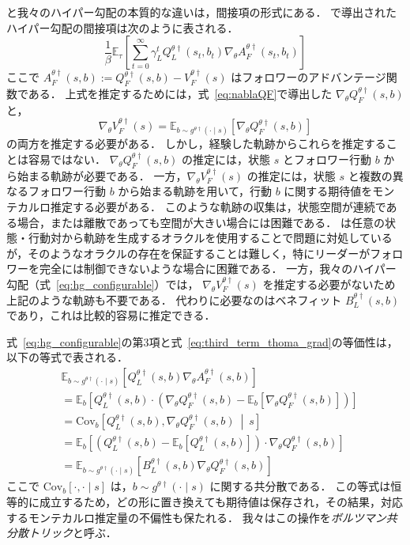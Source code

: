 \documentclass[originalpaper,fleqn]{jsaiart}     %
\providecommand{\E}{\mathbb{E}} %
\begin{document}
\cite{Thoma2024-em}と我々のハイパー勾配の本質的な違いは，間接項の形式にある．
\cite{Thoma2024-em}で導出されたハイパー勾配の間接項は次のように表される．
\begin{equation}
    \frac{1}{\beta} \E_\tau\left[\sum_{t=0}^\infty \gamma_L^t Q_L^{{\theta} \dagger}(s_t, b_t) \nabla_{\theta} A_F^{{\theta} \dagger}(s_t, b_t)  \right] \label{eq:third_term_thoma_grad}
\end{equation}
ここで $A_F^{{\theta} \dagger}(s, b) := Q_F^{{\theta} \dagger}(s, b) - V_F^{{\theta} \dagger}(s)$ はフォロワーのアドバンテージ関数である．
上式を推定するためには，式~\eqref{eq:nablaQF}で導出した $\nabla_{\theta} Q_F^{{\theta} \dagger}(s, b)$ と，$$\nabla_{\theta} V_F^{{\theta} \dagger}(s) = \E_{b \sim g^{{\theta}\dagger}(\cdot\mid s)}\left[\nabla_{\theta} Q_F^{{\theta} \dagger}(s, b)\right]$$ の両方を推定する必要がある．
しかし，経験した軌跡からこれらを推定することは容易ではない．
$\nabla_{\theta} Q_F^{{\theta} \dagger}(s, b)$ の推定には，状態 $s$ とフォロワー行動 $b$ から始まる軌跡が必要である．
一方，$\nabla_{\theta} V_F^{{\theta} \dagger}(s)$ の推定には，状態 $s$ と複数の異なるフォロワー行動 $b$ から始まる軌跡を用いて，行動 $b$ に関する期待値をモンテカルロ推定する必要がある．
このような軌跡の収集は，状態空間が連続である場合，または離散であっても空間が大きい場合には困難である．
\cite{Thoma2024-em}は任意の状態・行動対から軌跡を生成するオラクルを使用することで問題に対処しているが，そのようなオラクルの存在を保証することは難しく，特にリーダーがフォロワーを完全には制御できないような場合に困難である．
一方，我々のハイパー勾配（式~\eqref{eq:hg_configurable}）では， $\nabla_{\theta} V_F^{{\theta} \dagger}(s)$ を推定する必要がないため上記のような軌跡も不要である．
代わりに必要なのはベネフィット $B_L^{{\theta} \dagger}(s, b)$ であり，これは比較的容易に推定できる．

式~\eqref{eq:hg_configurable}の第3項と式~\eqref{eq:third_term_thoma_grad}の等価性は，以下の等式で表される．
\begin{equation*}
\begin{split}
    &\E_{b\sim g^{\theta\dagger}(\cdot\mid s)}\left[Q_L^{\theta\dag}(s,b)\nabla_{\theta} A_F^{{\theta} \dagger}(s, b)\right]\\
    &=\E_{b}\left[Q_L^{\theta\dag}(s,b)\cdot\left(\nabla_{\theta} Q_F^{{\theta} \dagger}(s, b) - \E_{b}\left[\nabla_{\theta} Q_F^{{\theta} \dagger}(s, b)\right]\right)\right]\\
    &=\mathrm{Cov}_{b}\left[Q_L^{\theta\dag}(s,b), \nabla_{\theta}Q_F^{\theta\dag}(s,b)~\middle|~ s\right]\\
    &=\E_{b}\left[\left(Q_L^{\theta\dag}(s,b) - \E_{b}\left[Q_L^{{\theta} \dagger}(s, b)\right]\right)\cdot \nabla_{\theta} Q_F^{{\theta} \dagger}(s, b)\right]\\
    &=\E_{b\sim g^{\theta\dagger}(\cdot\mid s)}\left[B_L^{\theta\dag}(s,b)\nabla_{\theta} Q_F^{{\theta} \dagger}(s, b)\right]
\end{split}
\end{equation*}
ここで $\mathrm{Cov}_{b}[\cdot,\cdot\mid s]$ は，$b\sim g^{\theta\dagger}(\cdot\mid s)$ に関する共分散である．
この等式は恒等的に成立するため，どの形に置き換えても期待値は保存され，その結果，対応するモンテカルロ推定量の不偏性も保たれる．
我々はこの操作を\emph{ボルツマン共分散トリック}と呼ぶ．
\end{document}
